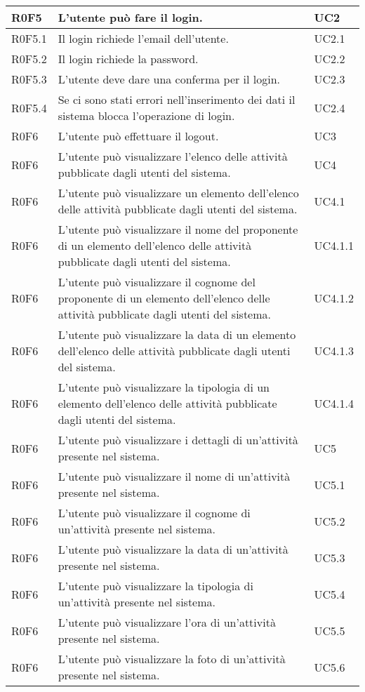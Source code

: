 \begin{center}
\begin{longtable}{|p{3cm}|p{8cm}|p{3cm}|}
 R0F5 & L’utente può fare il login. & UC2 \\ \hline
 R0F5.1 & Il login richiede l'email dell'utente. & UC2.1 \\ \hline
 R0F5.2 & Il login richiede la password. &  UC2.2 \\ \hline
 R0F5.3 & L’utente deve dare una conferma per il login. & UC2.3  \\ \hline
 R0F5.4 & Se ci sono stati errori nell’inserimento dei dati il sistema blocca l’operazione di login. & UC2.4 \\ \hline
 R0F6 & L’utente può effettuare il logout. & UC3 \\ \hline
R0F6 & L’utente può visualizzare l'elenco delle attività pubblicate dagli utenti del sistema. & UC4 \\ \hline
R0F6 & L’utente può visualizzare un elemento dell'elenco delle attività pubblicate dagli utenti del sistema. & UC4.1 \\ \hline
R0F6 & L’utente può visualizzare il nome del proponente di un elemento dell'elenco delle attività pubblicate dagli utenti del sistema. & UC4.1.1 \\ \hline
R0F6 & L’utente può visualizzare il cognome del proponente di un elemento dell'elenco delle attività pubblicate dagli utenti del sistema. & UC4.1.2 \\ \hline
R0F6 & L’utente può visualizzare la data di un elemento dell'elenco delle attività pubblicate dagli utenti del sistema. & UC4.1.3 \\ \hline
R0F6 & L’utente può visualizzare la tipologia di un elemento dell'elenco delle attività pubblicate dagli utenti del sistema. & UC4.1.4 \\ \hline
R0F6 & L’utente può visualizzare i dettagli di un'attività presente nel sistema. & UC5 \\ \hline
R0F6 & L’utente può visualizzare il nome di un'attività presente nel sistema. & UC5.1 \\ \hline
R0F6 & L’utente può visualizzare il cognome di un'attività presente nel sistema. & UC5.2 \\ \hline
R0F6 & L’utente può visualizzare la data di un'attività presente nel sistema. & UC5.3 \\ \hline
R0F6 & L’utente può visualizzare la tipologia di un'attività presente nel sistema. & UC5.4 \\ \hline
R0F6 & L’utente può visualizzare l'ora di un'attività presente nel sistema. & UC5.5 \\ \hline
R0F6 & L’utente può visualizzare la foto di un'attività presente nel sistema. & UC5.6 \\ \hline

\end{longtable}
\end{center}
